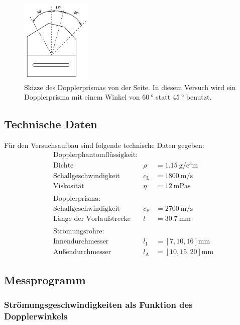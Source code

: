 \begin{figure}
  \centering
  \includegraphics[height=4cm]{Dopplerprisma.png}
  \caption{Skizze des Dopplerprismas von der Seite. In diesem Versuch wird ein
  Dopplerprisma mit einem Winkel von $\SI{60}{\degree}$ statt $\SI{45}{\degree}$
  benutzt. \cite{anleitung}}
  \label{fig:Dopplerprisma}
\end{figure}

\subsection{Technische Daten}

Für den Versuchsaufbau sind folgende technische Daten gegeben:
\begin{align*}
  & \text{Dopplerphantomflüssigkeit:} \\
  & \text{Dichte} & \rho & = \SI{1.15}{\gram\per\cubic\centi\meter} \\
  & \text{Schallgeschwindigkeit} & c_\text{L} & = \SI{1800}{\meter\per\second} \\
  & \text{Viskosität} & \eta & = \SI{12}{\milli\pascal\second} \\ \\
  & \text{Dopplerprisma:} \\
  & \text{Schallgeschwindigkeit} & c_\text{P} & = \SI{2700}{\meter\per\second} \\
  & \text{Länge der Vorlaufstrecke} & l & = \SI{30.7}{\milli\meter} \\ \\
  & \text{Strömungsrohre:} \\
  & \text{Innendurchmesser} & l_\text{I} & = [7, 10, 16]\si{\milli\meter} \\
  & \text{Außendurchmesser} & l_\text{A} & = [10, 15, 20]\si{\milli\meter}
\end{align*}

\subsection{Messprogramm}

\subsubsection{Strömungsgeschwindigkeiten als Funktion des Dopplerwinkels}

